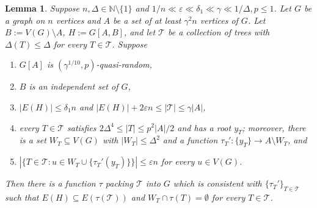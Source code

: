 \documentclass[a4paper, 11pt, reqno]{amsart}
\newtheorem{lemma}[definition]{Lemma}
\numberwithin{equation}{section}
\newcommand{\1}{{\rm 1\hspace*{-0.4ex}%
\rule{0.1ex}{1.52ex}\hspace*{0.2ex}}}
\newcommand{\N}{\mathbb N}
\newcommand{\es}{\emptyset}
\newcommand{\cT}{\mathcal{T}}
\renewcommand{\epsilon}{\varepsilon}
\newcommand{\sm}{\setminus}
\newcommand{\sub}{\subseteq}
\begin{document}
\begin{lemma}\label{lem: clear parity}
Suppose $n,\Delta \in \N\sm\{1\}$ and $1/n \ll \epsilon \ll \delta_1  \ll\gamma\ll 1/\Delta,p\leq 1$.
Let $G$ be a graph on $n$ vertices and $A$ be a set of at least $\gamma^2n$ vertices of $G$.
Let $B:=V(G)\sm A$, $H:=G[A,B]$, and let $\cT$ be a collection of trees with $\Delta(T)\leq \Delta$ for every $T\in \cT$. 
Suppose 
\begin{enumerate}[label=(c3.\arabic*)]
	\item\label{item:L31} $G[A]$ is $(\gamma^{1/10},p)$-quasi-random, 
	\item\label{item:L32} $B$ is an independent set of $G$,
	\item\label{item:L33} $|E(H)| \leq \delta_1 n$ and $|E(H)| +2\epsilon n \leq |\cT| \leq \gamma |A|$,
	\item\label{item:L34} every $T\in \cT$ satisfies $2\Delta^4 \leq |T|\leq p^2 |A|/2$ and has a root $y_T$;
	moreover, there is a set $W_T\sub V(G)$ with $|W_T|\leq \Delta^2$
	and a function $\tau_T':\{y_T\}\to A\sm W_T$, and
  \item\label{item:L35} $|\{T\in \cT: u\in W_{T}\cup \{\tau_{T}'(y_T)\}\}|\leq \epsilon n$ for every $u\in V(G)$.
\end{enumerate}
Then there is a function $\tau$ packing $\cT$ into $G$ which is consistent with $\{\tau_T'\}_{T\in \cT}$ such that 
$E(H)\sub E(\tau(\cT))$ 
and $W_T\cap \tau(T)=\es$ for every $T\in \cT$.
\end{lemma}
\end{document}
